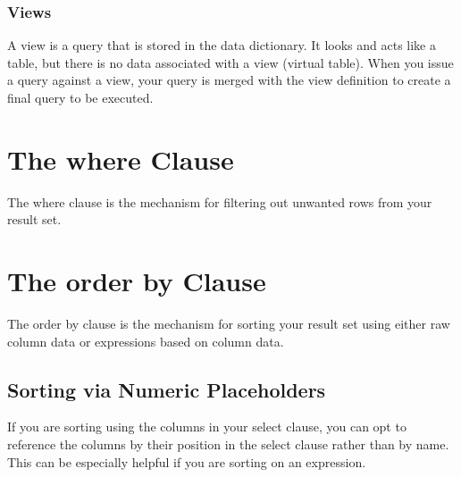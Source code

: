 \subsubsection*{Views}
A view is a query that is stored in the data dictionary. It looks and acts like a table, but there is no data associated with a view (virtual table). When you issue a query against a view, your query is merged with the view definition to create a final query to be executed.

\section{The where Clause}
\begin{tcolorbox}
    The where clause is the mechanism for filtering out unwanted rows from your result set.
\end{tcolorbox}

\section{The order by Clause}
\begin{tcolorbox}
    The order by clause is the mechanism for sorting your result set using either raw column data or expressions based on column data.
\end{tcolorbox}
\subsection{Sorting via Numeric Placeholders}
If you are sorting using the columns in your select clause, you can opt to reference the columns by their position in the select clause rather than by name. This can be especially helpful if you are sorting on an expression.